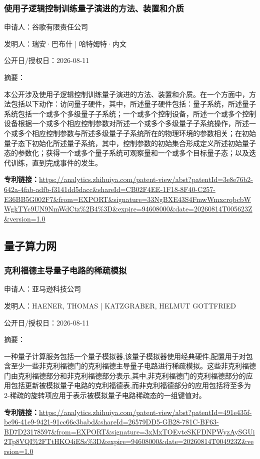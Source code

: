 \documentclass[12pt,a4paper]{ctexart}
\begin{document}
\subsubsection{ 使用子逻辑控制训练量子演进的方法、装置和介质 }

申请人：谷歌有限责任公司

发明人：瑞安·巴布什 | 哈特姆特·内文

公开日/授权日：2026-08-11

摘要：

本公开涉及使用子逻辑控制训练量子演进的方法、装置和介质。在一个方面中，方法包括以下动作：访问量子硬件，其中，所述量子硬件包括：量子系统，所述量子系统包括一个或多个多级量子子系统；一个或多个控制设备，所述一个或多个控制设备根据一个或多个相应控制参数对所述一个或多个多级量子子系统操作，所述一个或多个相应控制参数与所述多级量子子系统所在的物理环境的参数相关；在初始量子态下初始化所述量子系统，其中，控制参数的初始集合形成定义所述初始量子态的参数化；获得一个或多个量子系统可观察量和一个或多个目标量子态；以及迭代训练，直到完成事件的发生。

\noindent\textbf{专利链接：}\url{https://analytics.zhihuiya.com/patent-view/abst?patentId=3e8e76b2-642a-4fab-adfb-f3141dd5dacc&shareId=CB02F4EE-1F18-8F40-C257-E36BB5G002F7&from=EXPORT&signature=33NgBXE43S4FmwWmxcrqbcbWWgkTYc9UN9NmWdCtz%2B4%3D&expire=94608000&date=20260814T005623Z&version=1.0}


\subsection{ 量子算力网 }

\subsubsection{ 克利福德主导量子电路的稀疏模拟 }

申请人：亚马逊科技公司

发明人：HAENER, THOMAS | KATZGRABER, HELMUT GOTTFRIED

公开日/授权日：2026-08-11

摘要：

一种量子计算服务包括一个量子模拟器,该量子模拟器使用经典硬件,配置用于对包含至少一些非克利福德门的克利福德主导量子电路进行稀疏模拟。这些非克利福德门由克利福德部分和非克利福德部分表示,其中,非克利福德门的克利福德部分的应用包括更新被模拟量子电路的克利福德表,而非克利福德部分的应用包括将至多为2-稀疏的旋转项应用于表示被模拟量子电路稀疏态的一组键值对。

\noindent\textbf{专利链接：}\url{https://analytics.zhihuiya.com/patent-view/abst?patentId=491e435f-be96-41e9-9421-91cc66e3babd&shareId=26579DD5-GB28-781C-BF63-BD7D23178597&from=EXPORT&signature=3xMxTOEvteSKFDNPWyzAySGUi2Tp8VQI%2FTtHKO4iESs%3D&expire=94608000&date=20260814T004923Z&version=1.0}
\end{document}
